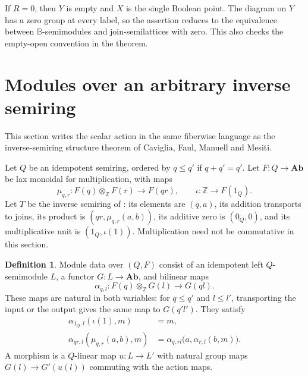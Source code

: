 \documentclass[11pt]{amsart}
\newcommand{\B}{\mathbb B}
\newcommand{\Z}{\mathbb Z}
\newcommand{\Ab}{\mathbf{Ab}}
\theoremstyle{definition}
\newtheorem{definition}[theorem]{Definition}
\theoremstyle{remark}
\begin{document}
If $R=0$, then $Y$ is empty and $X$ is the single Boolean point. The diagram on $Y$ has a zero group at every label, so the assertion reduces to the equivalence between $\B$-semimodules and join-semilattices with zero. This also checks the empty-open convention in the theorem.

\section{Modules over an arbitrary inverse semiring}\label{sec:general}
This section writes the scalar action in the same fiberwise language as the inverse-semiring structure theorem of Caviglia, Faul, Manuell and Mesiti.

Let $Q$ be an idempotent semiring, ordered by $q\le q'$ if $q+q'=q'$. Let $F:Q\to\Ab$ be lax monoidal for multiplication, with maps
\[
 \mu_{q,r}:F(q)\otimes_{\Z}F(r)\longrightarrow F(qr),
 \qquad \iota:\Z\longrightarrow F(1_Q).
\]
Let $T$ be the inverse semiring of \cite[Theorem~8.5]{CFMM}: its elements are $(q,a)$, its addition transports to joins, its product is $(qr,\mu_{q,r}(a,b))$, its additive zero is $(0_Q,0)$, and its multiplicative unit is $(1_Q,\iota(1))$. Multiplication need not be commutative in this section.

\begin{definition}\label{def:actiondata}
Module data over $(Q,F)$ consist of an idempotent left $Q$-semimodule $L$, a functor $G:L\to\Ab$, and bilinear maps
\[
 \alpha_{q,l}:F(q)\otimes_{\Z}G(l)\longrightarrow G(ql).
\]
These maps are natural in both variables: for $q\le q'$ and $l\le l'$, transporting the input or the output gives the same map to $G(q'l')$. They satisfy
\begin{align*}
 \alpha_{1_Q,l}(\iota(1),m)&=m,\\
 \alpha_{qr,l}(\mu_{q,r}(a,b),m)
 &=\alpha_{q,rl}\bigl(a,\alpha_{r,l}(b,m)\bigr).
\end{align*}
A morphism is a $Q$-linear map $u:L\to L'$ with natural group maps $G(l)\to G'(u(l))$ commuting with the action maps.
\end{definition}
\end{document}
